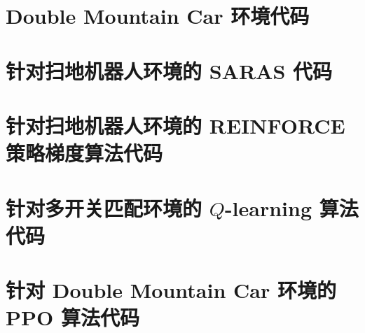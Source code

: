 \documentclass[citestyle=gb7714-2015, bibstyle=gb7714-2015,lang=cn,14pt,scheme=chinese]{elegantbook}
\begin{document}


\section{Double Mountain Car 环境代码}\label{sec:double-mountain-car-env}



\section{针对扫地机器人环境的 SARAS 代码}\label{sec:saras}



\section{针对扫地机器人环境的 REINFORCE 策略梯度算法代码}\label{sec:REINFORCE}



\section{针对多开关匹配环境的 \(Q\)-learning 算法代码}\label{sec:q-learning}



\section{针对 Double Mountain Car 环境的 PPO 算法代码}\label{sec:ppo}


\end{document}
